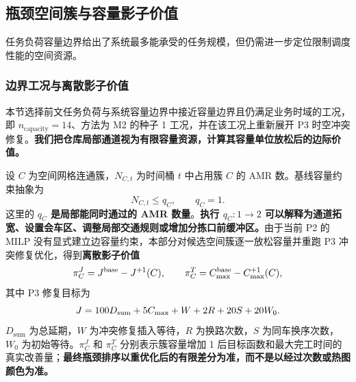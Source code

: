 \subsection{瓶颈空间簇与容量影子价值}

任务负荷容量边界给出了系统最多能承受的任务规模，但仍需进一步定位限制调度性能的空间资源。

\subsubsection{边界工况与离散影子价值}

本节选择前文任务负荷与系统容量边界中接近容量边界且仍满足业务时域的工况，即 $n_{\mathrm{capacity}}=14$、方法为 M2 的种子 1 工况，并在该工况上重新展开 P3 时空冲突修复。\textbf{我们把仓库局部通道视为有限容量资源，计算其容量单位放松后的边际价值。}

设 $C$ 为空间网格连通簇，$N_{C,t}$ 为时间桶 $t$ 中占用簇 $C$ 的 AMR 数。基线容量约束抽象为
\begin{equation}
N_{C,t}\leq q_C,\qquad q_C=1.
\end{equation}
这里的 \textbf{$q_C$ 是局部能同时通过的 AMR 数量}。\textbf{执行 $q_C:1\rightarrow 2$ 可以解释为通道拓宽、设置会车区、调整局部交通规则或增加分拣口前缓冲区。}由于当前 P2 的 MILP 没有显式建立边容量约束，本部分对候选空间簇逐一放松容量并重跑 P3 冲突修复优化，得到\textbf{离散影子价值}
\begin{equation}
\pi_C^{J}=J^{\mathrm{base}}-J^{+1}(C),\qquad
\pi_C^{T}=C_{\max}^{\mathrm{base}}-C_{\max}^{+1}(C),
\end{equation}
其中 P3 修复目标为
\begin{equation}
J=100D_{\mathrm{sum}}+5C_{\max}+W+2R+20S+20W_0.
\end{equation}
$D_{\mathrm{sum}}$ 为总延期，$W$ 为冲突修复插入等待，$R$ 为换路次数，$S$ 为同车换序次数，$W_0$ 为初始等待。$\pi_C^J$ 和 $\pi_C^T$ 分别表示簇容量增加 1 后目标函数和最大完工时间的真实改善量；\textbf{最终瓶颈排序以重优化后的有限差分为准，而不是以经过次数或热图颜色为准。}

